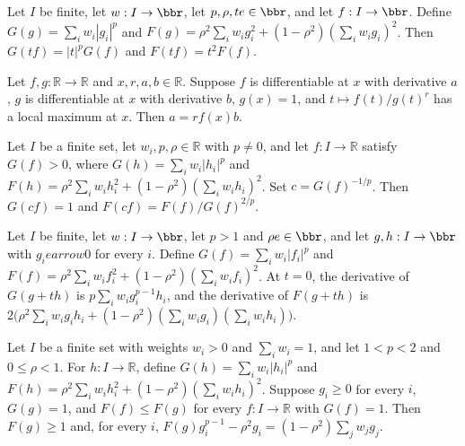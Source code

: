 \begin{theorem}
\leanok
{}
Let $I$ be finite, let $w:I\to\bbr$, let $p,\rho,t
e\in\bbr$, and let $f:I\to\bbr$. Define $G(g)=\sum_iw_i|g_i|^p$ and
$F(g)=\rho^2\sum_iw_ig_i^2+(1-\rho^2)(\sum_iw_ig_i)^2$. Then $G(tf)=|t|^pG(f)$ and
$F(tf)=t^2F(f)$.
\end{theorem}

\begin{theorem}
\leanok
{}
Let $f,g:\mathbb{R}\to\mathbb{R}$ and $x,r,a,b\in\mathbb{R}$. Suppose $f$ is
differentiable at $x$ with derivative $a$, $g$ is differentiable at $x$ with derivative
$b$, $g(x)=1$, and $t\mapsto f(t)/g(t)^r$ has a local maximum at $x$. Then $a=r f(x)b$.
\end{theorem}

\begin{theorem}
\leanok
{}
Let $I$ be a finite set, let $w_i,p,\rho\in\mathbb{R}$ with $p\ne0$, and let
$f:I\to\mathbb{R}$ satisfy $G(f)>0$, where $G(h)=\sum_iw_i|h_i|^p$ and
$F(h)=\rho^2\sum_iw_i h_i^2+(1-\rho^2)(\sum_iw_i h_i)^2$. Set $c=G(f)^{-1/p}$. Then
$G(cf)=1$ and $F(cf)=F(f)/G(f)^{2/p}$.
\end{theorem}

\begin{theorem}
\leanok
{}
Let $I$ be finite, let $w:I\to\bbr$, let $p>1$ and $\rho
e\in\bbr$, and let $g,h:I\to\bbr$ with $g_i
earrow0$ for every $i$. Define $G(f)=\sum_iw_i|f_i|^p$ and
$F(f)=\rho^2\sum_iw_if_i^2+(1-\rho^2)(\sum_iw_if_i)^2$. At $t=0$, the derivative of
$G(g+th)$ is $p\sum_iw_ig_i^{p-1}h_i$, and the derivative of $F(g+th)$ is
$2\bigl(\rho^2\sum_iw_ig_ih_i+(1-\rho^2)(\sum_iw_ig_i)(\sum_iw_ih_i)\bigr)$.
\end{theorem}

\begin{theorem}
\leanok
{}
Let $I$ be a finite set with weights $w_i>0$ and $\sum_iw_i=1$, and let $1<p<2$ and
$0\le\rho<1$. For $h:I\to\mathbb{R}$, define $G(h)=\sum_iw_i|h_i|^p$ and
$F(h)=\rho^2\sum_iw_i h_i^2+(1-\rho^2)(\sum_iw_i h_i)^2$. Suppose $g_i\ge0$ for every
$i$, $G(g)=1$, and $F(f)\le F(g)$ for every $f:I\to\mathbb{R}$ with $G(f)=1$. Then
$F(g)\ge1$ and, for every $i$, $F(g)g_i^{p-1}-\rho^2g_i=(1-\rho^2)\sum_jw_jg_j$.
\end{theorem}

